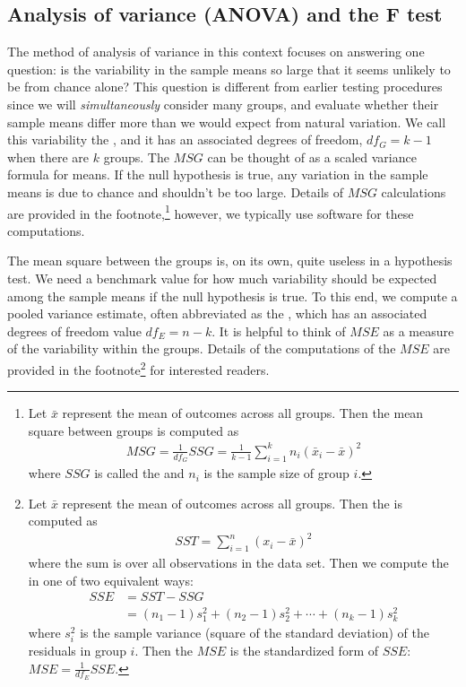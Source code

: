 \subsection{Analysis of variance (ANOVA) and the F test}

The method of analysis of variance in this context focuses on answering one question: is the variability in the sample means so large that it seems unlikely to be from chance alone? This question is different from earlier testing procedures since we will \emph{simultaneously} consider many groups, and evaluate whether their sample means differ more than we would expect from natural variation. We call this variability the , and it has an associated degrees of freedom, $df_{G}=k-1$ when there are $k$ groups. The $MSG$ can be thought of as a scaled variance formula for means. If the null hypothesis is true, any variation in the sample means is due to chance and shouldn't be too large. Details of $MSG$ calculations are provided in the footnote,\footnote{Let $\bar{x}$ represent the mean of outcomes across all groups. Then the mean square between groups is computed as
\begin{align*}
MSG = \frac{1}{df_{G}}SSG = \frac{1}{k-1}\sum_{i=1}^{k} n_{i}\left(\bar{x}_{i} - \bar{x}\right)^2
\end{align*}
where $SSG$ is called the  and $n_{i}$ is the sample size of group $i$.} however, we typically use software for these computations.

The mean square between the groups is, on its own, quite useless in a hypothesis test. We need a benchmark value for how much variability should be expected among the sample means if the null hypothesis is true. To this end, we compute a pooled variance estimate, often abbreviated as the , which has an associated degrees of freedom value $df_E=n-k$. It is helpful to think of $MSE$ as a measure of the variability within the groups. Details of the computations of the $MSE$ are provided in the footnote\footnote{Let $\bar{x}$ represent the mean of outcomes across all groups. Then the  is computed as
\begin{align*}
SST = \sum_{i=1}^{n} \left(x_{i} - \bar{x}\right)^2
\end{align*}
where the sum is over all observations in the data set. Then we compute the  in one of two equivalent ways:
\begin{align*}
SSE &= SST - SSG \\
	&= (n_1-1)s_1^2 + (n_2-1)s_2^2 + \cdots + (n_k-1)s_k^2
\end{align*}
where $s_i^2$ is the sample variance (square of the standard deviation) of the residuals in group $i$. Then the $MSE$ is the standardized form of $SSE$: $MSE = \frac{1}{df_{E}}SSE$.} for interested readers.

